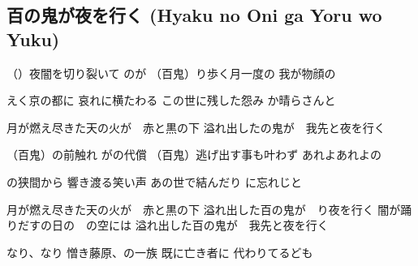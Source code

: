 \subsection{百の鬼が夜を行く \- (Hyaku no Oni ga Yoru wo Yuku)}
\begin{center}
\begin{obeylines}

（）夜闇を切り裂いて
のが
（百鬼）り歩く月一度の
我が物顔の
\hfill

えく京の都に
哀れに横たわる
この世に残した怨み
か晴らさんと
\hfill

月が燃え尽きた天の火が　赤と黒の下
溢れ出したの鬼が　我先と夜を行く
\hfill

（百鬼）の前触れ
がの代償
（百鬼）逃げ出す事も叶わず
あれよあれよの
\hfill


の狭間から
響き渡る笑い声
あの世で結んだり
に忘れじと
\hfill

月が燃え尽きた天の火が　赤と黒の下
溢れ出した百の鬼が　り夜を行く
闇が踊りだすの日の　の空には
溢れ出した百の鬼が　我先と夜を行く
\hfill


なり、なり
憎き藤原、の一族
既に亡き者に
代わりてるども
\end{obeylines}
\end{center}


